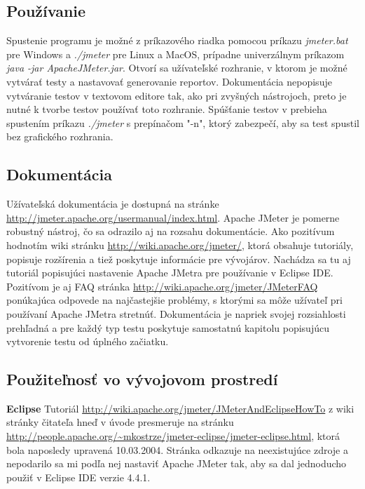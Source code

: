 \documentclass[12pt,oneside,final]{fithesis-utf8}
\begin{document}
\subsection{Používanie}
Spustenie programu je možné z príkazového riadka pomocou príkazu \textit{jmeter.bat} pre Windows a \textit{./jmeter} pre Linux a MacOS, prípadne univerzálnym príkazom \textit{java -jar ApacheJMeter.jar}. Otvorí sa užívateľské rozhranie, v ktorom je možné vytvárať testy a nastavovať generovanie reportov. Dokumentácia nepopisuje vytváranie testov v textovom editore tak, ako pri zvyšných nástrojoch, preto je nutné k tvorbe testov používať toto rozhranie. Spúšťanie testov v prebieha spustením  príkazu \textit{./jmeter} s prepínačom "{}-n"{}, ktorý zabezpečí, aby sa test spustil bez grafického rozhrania.

\subsection{Dokumentácia}
Užívateľská dokumentácia je dostupná na stránke \url{http://jmeter.apache.org/usermanual/index.html}. Apache JMeter je pomerne robustný nástroj, čo sa odrazilo aj na rozsahu dokumentácie. Ako pozitívum hodnotím wiki stránku \url{http://wiki.apache.org/jmeter/}, ktorá obsahuje tutoriály, popisuje rozšírenia a tiež poskytuje informácie pre vývojárov. Nachádza sa tu aj tutoriál popisujúci nastavenie Apache JMetra pre používanie v Eclipse IDE. Pozitívom je aj FAQ stránka \url{http://wiki.apache.org/jmeter/JMeterFAQ} ponúkajúca odpovede na najčastejšie problémy, s ktorými  sa môže užívateľ pri používaní Apache JMetra stretnúť. Dokumentácia je napriek svojej rozsiahlosti prehľadná a pre každý typ testu poskytuje samostatnú kapitolu popisujúcu vytvorenie testu od úplného začiatku.

\subsection{Použiteľnosť vo vývojovom prostredí}
\textbf{Eclipse}
\newline
Tutoriál \url{http://wiki.apache.org/jmeter/JMeterAndEclipseHowTo} z wiki stránky čitateľa hneď v úvode presmeruje na stránku \url{http://people.apache.org/~mkostrze/jmeter-eclipse/jmeter-eclipse.html}, ktorá bola naposledy upravená 10.03.2004. Stránka odkazuje na neexistujúce zdroje a nepodarilo sa mi podľa nej nastaviť Apache JMeter tak, aby sa dal jednoducho použiť v Eclipse IDE verzie 4.4.1.
\newline
\end{document}
